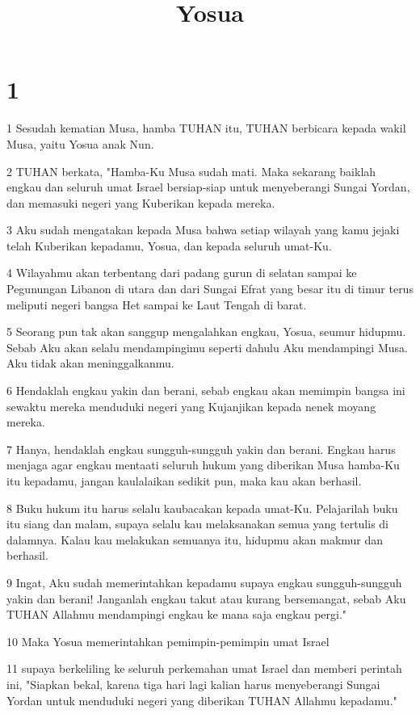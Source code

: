 

\title{Yosua}


\chapter{1}

\par 1 Sesudah kematian Musa, hamba TUHAN itu, TUHAN berbicara kepada wakil Musa, yaitu Yosua anak Nun.
\par 2 TUHAN berkata, "Hamba-Ku Musa sudah mati. Maka sekarang baiklah engkau dan seluruh umat Israel bersiap-siap untuk menyeberangi Sungai Yordan, dan memasuki negeri yang Kuberikan kepada mereka.
\par 3 Aku sudah mengatakan kepada Musa bahwa setiap wilayah yang kamu jejaki telah Kuberikan kepadamu, Yosua, dan kepada seluruh umat-Ku.
\par 4 Wilayahmu akan terbentang dari padang gurun di selatan sampai ke Pegunungan Libanon di utara dan dari Sungai Efrat yang besar itu di timur terus meliputi negeri bangsa Het sampai ke Laut Tengah di barat.
\par 5 Seorang pun tak akan sanggup mengalahkan engkau, Yosua, seumur hidupmu. Sebab Aku akan selalu mendampingimu seperti dahulu Aku mendampingi Musa. Aku tidak akan meninggalkanmu.
\par 6 Hendaklah engkau yakin dan berani, sebab engkau akan memimpin bangsa ini sewaktu mereka menduduki negeri yang Kujanjikan kepada nenek moyang mereka.
\par 7 Hanya, hendaklah engkau sungguh-sungguh yakin dan berani. Engkau harus menjaga agar engkau mentaati seluruh hukum yang diberikan Musa hamba-Ku itu kepadamu, jangan kaulalaikan sedikit pun, maka kau akan berhasil.
\par 8 Buku hukum itu harus selalu kaubacakan kepada umat-Ku. Pelajarilah buku itu siang dan malam, supaya selalu kau melaksanakan semua yang tertulis di dalamnya. Kalau kau melakukan semuanya itu, hidupmu akan makmur dan berhasil.
\par 9 Ingat, Aku sudah memerintahkan kepadamu supaya engkau sungguh-sungguh yakin dan berani! Janganlah engkau takut atau kurang bersemangat, sebab Aku TUHAN Allahmu mendampingi engkau ke mana saja engkau pergi."
\par 10 Maka Yosua memerintahkan pemimpin-pemimpin umat Israel
\par 11 supaya berkeliling ke seluruh perkemahan umat Israel dan memberi perintah ini, "Siapkan bekal, karena tiga hari lagi kalian harus menyeberangi Sungai Yordan untuk menduduki negeri yang diberikan TUHAN Allahmu kepadamu."
